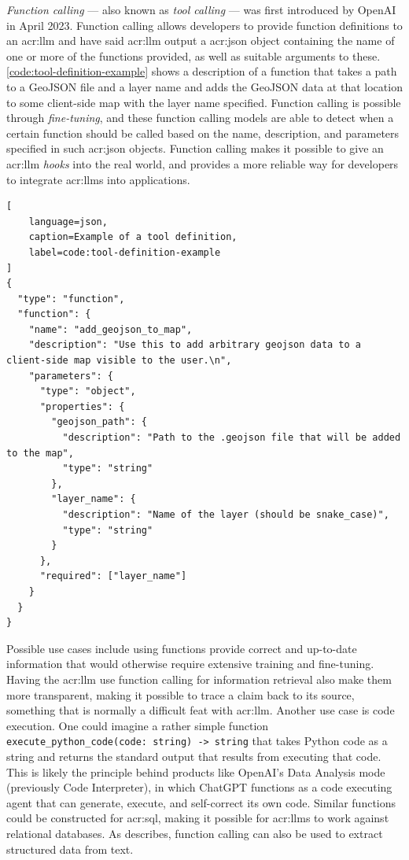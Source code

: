 \textit{Function calling} --- also known as \textit{tool calling} --- was first introduced by OpenAI \citep{eletiFunctionCallingOther2023} in April 2023. Function calling allows developers to provide function definitions to an \gls{acr:llm} and have said \gls{acr:llm} output a \acrshort{acr:json} object containing the name of one or more of the functions provided, as well as suitable arguments to these. \autoref{code:tool-definition-example} shows a description of a function that takes a path to a GeoJSON file and a layer name and adds the GeoJSON data at that location to some client-side map with the layer name specified. Function calling is possible through \textit{fine-tuning}, and these function calling models are able to detect when a certain function should be called based on the name, description, and parameters specified in such \acrshort{acr:json} objects. Function calling makes it possible to give an \gls{acr:llm} \textit{hooks} into the real world, and provides a more reliable way for developers to integrate \glspl{acr:llm} into applications.

\begin{lstlisting}[
    language=json,
    caption=Example of a tool definition,
    label=code:tool-definition-example
]
{
  "type": "function",
  "function": {
    "name": "add_geojson_to_map",
    "description": "Use this to add arbitrary geojson data to a client-side map visible to the user.\n",
    "parameters": {
      "type": "object",
      "properties": {
        "geojson_path": {
          "description": "Path to the .geojson file that will be added to the map",
          "type": "string"
        },
        "layer_name": {
          "description": "Name of the layer (should be snake_case)",
          "type": "string"
        }
      },
      "required": ["layer_name"]
    }
  }
}
\end{lstlisting}

Possible use cases include using functions provide correct and up-to-date information that would otherwise require extensive training and fine-tuning. Having the \gls{acr:llm} use function calling for information retrieval also make them more transparent, making it possible to trace a claim back to its source, something that is normally a difficult feat with \gls{acr:llm}. Another use case is code execution. One could imagine a rather simple function \texttt{execute\_python\_code(code: string) -> string} that takes Python code as a string and returns the standard output that results from executing that code. This is likely the principle behind products like OpenAI's Data Analysis mode (previously Code Interpreter), in which ChatGPT functions as a code executing agent that can generate, execute, and self-correct its own code. Similar functions could be constructed for \acrshort{acr:sql}, making it possible for \glspl{acr:llm} to work against relational databases. As \cite{eletiFunctionCallingOther2023} describes, function calling can also be used to extract structured data from text.

